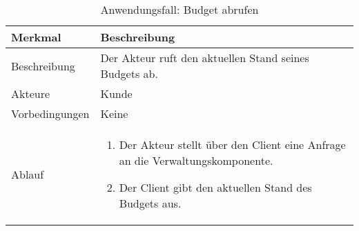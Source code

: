 \begin{table}[H]
    \centering
    \caption{Anwendungsfall: Budget abrufen}
    \label{tab:use_case_get_budget}
    \begin{tabularx}{\textwidth}{lX}
        \toprule
        \textbf{Merkmal} & \textbf{Beschreibung}  \\ \midrule
        Beschreibung    &  Der Akteur ruft den aktuellen Stand seines Budgets ab. \\
        Akteure         &  Kunde \\
        Vorbedingungen  &  Keine \\
        Ablauf          & \begin{minipage}[t]{\linewidth}
        \vspace*{-3mm}
        \begin{enumerate}[leftmargin=*,nosep,after=\strut]
            \item Der Akteur stellt über den Client eine Anfrage an die Verwaltungskomponente.
            \item Der Client gibt den aktuellen Stand des Budgets aus.
        \end{enumerate}
        \end{minipage} \\\bottomrule
    \end{tabularx}    
\setlength\belowcaptionskip{4pt}
\end{table}

